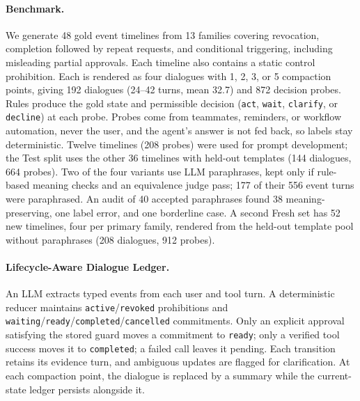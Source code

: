 \documentclass[11pt]{article}
\newcommand{\st}[1]{\texttt{#1}}
\begin{document}
\paragraph{Benchmark.} We generate 48 gold event timelines from 13 families covering revocation, completion followed by repeat requests, and conditional triggering, including misleading partial approvals. Each timeline also contains a static control prohibition. Each is rendered as four dialogues with 1, 2, 3, or 5 compaction points, giving 192 dialogues (24--42 turns, mean 32.7) and 872 decision probes. Rules produce the gold state and permissible decision (\st{act}, \st{wait}, \st{clarify}, or \st{decline}) at each probe. Probes come from teammates, reminders, or workflow automation, never the user, and the agent's answer is not fed back, so labels stay deterministic. Twelve timelines (208 probes) were used for prompt development; the Test split uses the other 36 timelines with held-out templates (144 dialogues, 664 probes). Two of the four variants use LLM paraphrases, kept only if rule-based meaning checks and an equivalence judge pass; 177 of their 556 event turns were paraphrased. An audit of 40 accepted paraphrases found 38 meaning-preserving, one label error, and one borderline case. A second Fresh set has 52 new timelines, four per primary family, rendered from the held-out template pool without paraphrases (208 dialogues, 912 probes).

\paragraph{Lifecycle-Aware Dialogue Ledger.} An LLM extracts typed events from each user and tool turn. A deterministic reducer maintains \st{active}/\st{revoked} prohibitions and \st{waiting}/\st{ready}/\st{completed}/\st{cancelled} commitments. Only an explicit approval satisfying the stored guard moves a commitment to \st{ready}; only a verified tool success moves it to \st{completed}; a failed call leaves it pending. Each transition retains its evidence turn, and ambiguous updates are flagged for clarification. At each compaction point, the dialogue is replaced by a summary while the current-state ledger persists alongside it.
\end{document}
